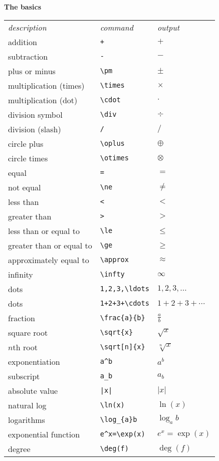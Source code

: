 \documentclass[10pt,landscape]{article}
\newcommand{\ColorSubsection}[1]{\par\vspace{1ex}\noindent\textcolor{subsectioncolor}{\normalsize\bfseries #1}\par\vspace{0.5ex}}
\begin{document}
\begin{multicols}{3}
\ColorSubsection{The basics}
\begin{tabular}{lll}
\emph{description} & \emph{command} & \emph{output}\\
addition & \verb!+! & $+$\\
subtraction & \verb!-! & $-$\\
plus or minus & \verb!\pm! & $\pm$\\
multiplication (times) & \verb!\times! & $\times$\\
multiplication (dot) & \verb!\cdot! & $\cdot$\\
division symbol & \verb!\div! & $\div$\\
division (slash) & \verb!/! & $/$\\
circle plus & \verb!\oplus! & $\oplus$\\
circle times & \verb!\otimes! & $\otimes$\\
equal & \verb!=! & $=$\\
not equal & \verb!\ne! & $\ne$\\
less than & \verb!<! & $<$\\
greater than & \verb!>! & $>$\\
less than or equal to & \verb!\le! & $\le$\\
greater than or equal to & \verb!\ge! & $\ge$\\
approximately equal to & \verb!\approx! & $\approx$\\
infinity & \verb!\infty! & $\infty$\\
dots & \verb!1,2,3,\ldots! & $1,2,3,\ldots$\\
dots & \verb!1+2+3+\cdots! & $1+2+3+\cdots$\\
fraction & \verb!\frac{a}{b}! & $\frac{a}{b}$\\
square root & \verb!\sqrt{x}! & $\sqrt{x}$\\
$n$th root & \verb!\sqrt[n]{x}! & $\sqrt[n]{x}$\\
exponentiation & \verb!a^b! & $a^{b}$\\
subscript & \verb!a_b! & $a_{b}$\\
absolute value & \verb!|x|! & $|x|$\\
natural log  & \verb!\ln(x)! & $\ln(x)$\\
logarithms & \verb!\log_{a}b! & $\log_{a}b$\\
exponential function & \verb!e^x=\exp(x)! & $e^{x}=\exp(x)$\\
degree & \verb!\deg(f)! & $\deg(f)$\\
\end{tabular}


\end{multicols}
\end{document}
